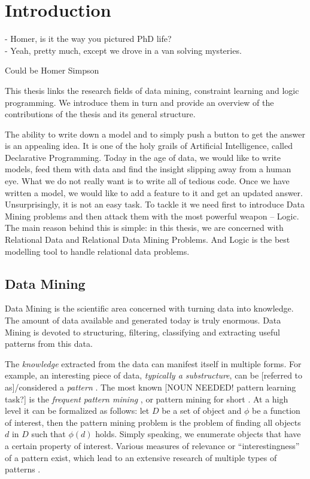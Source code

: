 \chapter{Introduction}\label{ch:introduction}
\epigraph{
- Homer, is it the way you pictured PhD life?\\
- Yeah, pretty much, except we drove in a van solving mysteries.
}{Could be Homer Simpson}

\begin{addmargin}[2em]{2em}
This thesis links the research fields of data mining, constraint learning
and logic programming. We introduce them in turn and provide an overview of the
contributions of the thesis and
its general structure.
\end{addmargin}

The ability to write down a model and to simply push a button to get the
answer is an appealing idea. It is one of the holy grails of
Artificial Intelligence, called Declarative Programming. Today in the age of data, we would like
to write models, feed them with data and find the insight slipping
away from a human eye. What we do not really want is to write
all of tedious code. Once we have written a model, we would like
to add a feature to it and get an updated answer. Unsurprisingly, it is
not an easy task. To tackle it we need first to introduce Data Mining
problems and then attack them with the most powerful weapon -- Logic.
The main reason behind this is simple: in this thesis, we are
concerned with Relational Data and Relational Data Mining Problems.
And Logic is the best modelling tool to handle relational data
problems. 

\section{Data Mining}
Data Mining is the scientific area concerned with turning data into knowledge. 
The amount of data available and generated today is truly enormous. 
Data Mining is devoted to structuring, filtering, classifying and extracting useful patterns from this data.

The \textit{knowledge} extracted from the data can manifest itself in
multiple forms. For example, an interesting piece of data,
\textit{typically a substructure}, can be
[referred to as]/considered a \textit{pattern} \parencite{han_book}. 
The most known [NOUN NEEDED! pattern learning task?] is the
\textit{frequent pattern mining} , or pattern mining for short \parencite{survey_han}. 
At a high level it can be formalized as follows: 
let $D$ be a set of object and $\phi$ be a function of
interest, then the pattern mining problem is the problem of finding
all objects $d$ in $D$ such that $\phi(d)$ holds.
Simply speaking, we enumerate objects that have a certain property of
interest.
Various measures of relevance or ``interestingness'' of a pattern exist, which lead to an extensive research of multiple types of patterns \parencite{tias_topk}.


